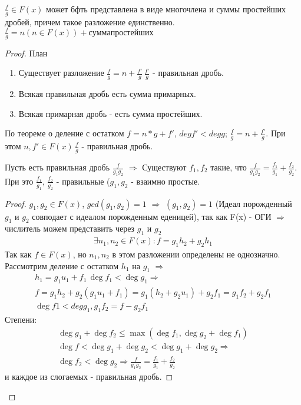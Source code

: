 \begin{theorem}{}
$\frac{f}{g} \in  F(x)$ может бфть представлена в виде многочлена и суммы простейших дробей,
причем такое разложение единственно.
$\frac{f}{g} = n (n \in F(x)) + сумма простейших$

\begin{proof}
План
\begin{enumerate}
\item Существует разложение $\frac{f}{g} = n + \frac{f'}{g}\, \frac{f'}{g}$ - правильная дробь.
\item Всякая правильная дробь есть сумма примарных.
\item Всякая примарная дробь - есть сумма простейших.
\end{enumerate}

\begin{Rem}
По теореме о деление с остатком $f = n*g +f'$, $deg f' < deg g$;
$\frac{f}{g} = n + \frac{f'}{g}$. При этом $n, f'\in F(x)\, \frac{f}{g}$ - правильная дробь.
\end{Rem}

 
\begin{lemma}
Пусть есть правильная дробь $\frac{f}{g_1 g_2}$ $\Rightarrow$ Существуют $f_1, f_2$ такие, что
$\frac{f}{g_1 g_2} = \frac{f_1}{g_1} + \frac{f_2}{g_2}$. При это
$ \frac{f_1}{g_1}$, $\frac{f_2}{g_2}$ - правильные
($g_1, g_2$ - взаимно простые. 
\begin{proof}
$g_1, g_2 \in F(x)$, $gcd(g_1, g_2) = 1$ $\Rightarrow$ $(g_1, g_2) = 1$ (Идеал порожденный $g_1$ и $g_2$
совподает с идеалом порожденным еденицей), так как F(x) - ОГИ $\Rightarrow$ числитель можем представить через $g_1$ и $g_2$
\begin{gather*}
\exists n_1, n_2 \in F(x) : f = g_1 h_2 + g_2 h_1
\end{gather*}
Так как $f \in F(x)$, но $n_1, n_2$  в этом разложении определены не однозначно.
Рассмотрим деление с остатком $h_1$ на $g_1$ $\Rightarrow$
\begin{gather*}
h_1 = g_1 u_1 + f_1\, \deg f_1 < \deg g_1 \Rightarrow \\
f = g_1 h_2 + g_2 (g_1 u_1 + f_1)= g_1 (h_2 + g_2 u_1) + g_2 f_1 = g_1 f_2 + g_2 f_1 \\
\deg f1 < deg g_1, g_1 f_2 = f - g_2 f_1
\end{gather*}
Степени:
\begin{gather*}
\deg g_1 + \deg f_2 \le \max (\deg f_1, \deg g_2 + \deg f_1) \\
\deg f < \deg g_1 + \deg g_2 < \deg g_1 + \deg g_2 \Rightarrow \\
\deg f_2 < \deg g_2 \Rightarrow \frac{f}{g_1 g_2} = \frac{f_1}{g_1} + \frac{f_2}{g_2}
\end{gather*}
и каждое из слогаемых - правильная дробь.
\end{proof}
\end{lemma}


\end{proof}
\end{theorem}
